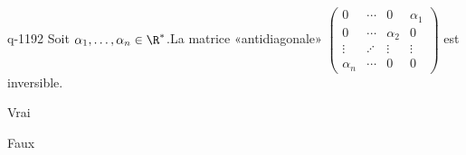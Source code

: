 \begin{truefalse}{q-1192}
Soit $\alpha_1, \ldots, \alpha_n \in \R^*$.\newline La matrice «antidiagonale» $\begin{pmatrix} 0 & \cdots & 0 & \alpha_1 \\ 0 & \cdots & \alpha_2 & 0 \\ \vdots & \iddots & \vdots & \vdots \\ \alpha_n & \cdots & 0 & 0 \end{pmatrix}$ est inversible.
\item* Vrai
\item Faux
\end{truefalse}

